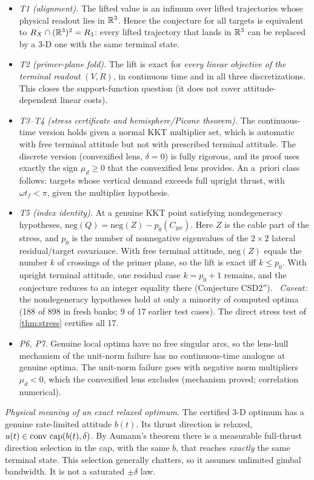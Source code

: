 \begin{itemize}[leftmargin=*,itemsep=2pt]
\item \emph{T1 (alignment).} The lifted value is an infimum over lifted trajectories whose physical readout lies in $\mathbb{R}^3$. Hence the
conjecture for all targets is equivalent to $R_X\cap(\mathbb{R}^3)^2=R_3$: every lifted trajectory that lands in $\mathbb{R}^3$ can be replaced by a
3-D one with the same terminal state. \Sproved
\item \emph{T2 (primer-plane fold).} The lift is exact for \emph{every linear objective of the terminal readout} $(V,R)$, in continuous
time and in all three discretizations. This closes the support-function question (it does not cover
attitude-dependent linear costs). \Sproved
\item \emph{T3--T4 (stress certificate and hemisphere/Picone theorem).} The continuous-time version holds given a normal KKT
multiplier set, which is automatic with free terminal attitude but not with prescribed terminal attitude. The discrete
version (convexified lens, $\delta=0$) is fully rigorous, and its proof uses exactly the sign $\mu_d\ge0$ that the convexified lens
provides. An a~priori class follows: targets whose vertical demand exceeds full upright thrust, with $\omega t_f<\pi$, given
the multiplier hypothesis. \Srep
\item \emph{T5 (index identity).} At a genuine KKT point satisfying nondegeneracy hypotheses,
$\mathrm{neg}(Q)=\mathrm{neg}(Z)-p_0(C_{yw})$. Here $Z$ is the cable part of the stress, and $p_0$ is the number of nonnegative eigenvalues of
the $2\times2$ lateral residual/target covariance. With free terminal attitude, $\mathrm{neg}(Z)$ equals the number $k$ of crossings
of the primer plane, so the lift is exact iff $k\le p_0$. With upright terminal attitude, one residual case $k=p_0+1$ remains, and
the conjecture reduces to an integer equality there (Conjecture CSD2$''$). \Srep\ \emph{Caveat:} the nondegeneracy hypotheses hold at
only a minority of computed optima (188 of 898 in fresh banks; 9 of 17 earlier test cases). The direct stress test of
\cref{thm:stress} certifies all 17.
\item \emph{P6, P7.} Genuine local optima have no free singular arcs, so the lens-hull mechanism of the unit-norm failure has no
continuous-time analogue at genuine optima. The unit-norm failure goes with negative norm multipliers $\mu_d<0$, which the
convexified lens excludes (mechanism proved; correlation numerical). \Sproved
\end{itemize}
\emph{Physical meaning of an exact relaxed optimum.} The certified 3-D optimum has a genuine rate-limited attitude $b(t)$. Its
thrust direction is relaxed, $u(t)\in\operatorname{conv}\,\mathrm{cap}(b(t),\delta)$. By Aumann's theorem there is a measurable full-thrust direction
selection in the cap, with the same $b$, that reaches \emph{exactly} the same terminal state. This selection generally chatters,
so it assumes unlimited gimbal bandwidth. It is not a saturated $\pm\delta$ law.

